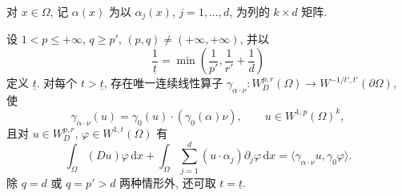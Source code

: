 对 $x\in\Omega$, 记 $\alpha(x)$ 为以 $\alpha_j(x)$, $j=1,\ldots,d$, 为列的 $k\times d$ 矩阵.

\begin{Theorem}
\label{thm:chap3-generalized-normal-trace}
设 $1<p\leq+\infty$, $q\geq p'$, $(p,q)\neq(+\infty,+\infty)$, 并以
\[
 \frac1{\underline t}=\min\left(\frac1{p'},\frac1{r'}+\frac1d\right)
\]
定义 $\underline t$. 对每个 $t>\underline t$, 存在唯一连续线性算子
$\gamma_{\alpha\cdot\nu}:W_D^{p,r}(\Omega)\to W^{-1/t',t'}(\partial\Omega)$, 使
\begin{equation}
 \gamma_{\alpha\cdot\nu}(u)=\gamma_0(u)\cdot(\gamma_0(\alpha)\nu),
 \qquad u\in W^{1,p}(\Omega)^k,
 \label{eq:chap3-generalized-normal-trace-definition}
\end{equation}
且对 $u\in W_D^{p,r}$, $\varphi\in W^{1,t}(\Omega)$ 有
\begin{equation}
 \int_\Omega(Du)\varphi\,\mathrm dx
 +\int_\Omega\sum_{j=1}^d(u\cdot\alpha_j)\partial_j\varphi\,\mathrm dx
 =\langle\gamma_{\alpha\cdot\nu}u,\gamma_0\varphi\rangle.
 \label{eq:chap3-generalized-stokes-formula}
\end{equation}
除 $q=d$ 或 $q=p'>d$ 两种情形外, 还可取 $t=\underline t$.
\end{Theorem}

